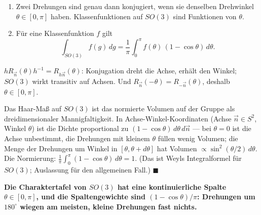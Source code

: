 \begin{merksatz}
\begin{enumerate}[label=(\alph*), leftmargin=1.6em]
\item Zwei Drehungen sind genau dann konjugiert, wenn sie denselben Drehwinkel $\theta\in[0, \pi]$ haben. Klassenfunktionen auf $SO(3)$ sind Funktionen von $\theta$.
\item Für eine Klassenfunktion $f$ gilt
\[ \int_{SO(3)}f(g)\,dg = \frac1\pi\int_0^{\pi}f(\theta)\,(1 - \cos\theta)\,d\theta . \]
\end{enumerate}

$hR_{\vec n}(\theta)h^{-1} = R_{h\vec n}(\theta)$: Konjugation dreht die Achse, erhält den Winkel; $SO(3)$ wirkt transitiv auf Achsen. Und $R_{\vec n}(-\theta) = R_{-\vec n}(\theta)$, deshalb $\theta\in[0, \pi]$.

Das Haar-Maß auf $SO(3)$ ist das normierte Volumen auf der Gruppe als dreidimensionaler Mannigfaltigkeit. In Achse-Winkel-Koordinaten (Achse $\vec n\in S^{2}$, Winkel $\theta$) ist die Dichte proportional zu $(1 - \cos\theta)\,d\theta\,d\vec n$ --- bei $\theta = 0$ ist die Achse unbestimmt, die Drehungen mit kleinem $\theta$ füllen wenig Volumen; die Menge der Drehungen um Winkel in $[\theta, \theta + d\theta]$ hat Volumen $\propto\sin^{2}(\theta/2)\,d\theta$. Die Normierung: $\frac1\pi\int_0^{\pi}(1 - \cos\theta)\,d\theta = 1$. (Das ist Weyls Integralformel für $SO(3)$; Auslassung für den allgemeinen Fall.) $\blacksquare$

\begin{center}
\begin{minipage}{0.9\textwidth}
\textbf{Die Charaktertafel von $SO(3)$ hat eine kontinuierliche Spalte $\theta\in[0, \pi]$, und die Spaltengewichte sind $(1 - \cos\theta)/\pi$: Drehungen um $180^{\circ}$ wiegen am meisten, kleine Drehungen fast nichts.}
\end{minipage}
\end{center}
\end{merksatz}

